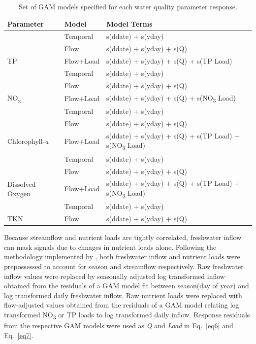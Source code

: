 \documentclass[fleqn,10pt,lineno]{wlpeerj} %
\begin{document}
\begin{table}

\caption{\label{tab:table3}Set of GAM models specified for each water quality parameter response.}
\centering
\begin{tabular}[t]{lll}
\toprule
Parameter & Model & Model Terms\\
\midrule
 & Temporal & s(ddate) + s(yday)\\

 & Flow & s(ddate) + s(yday) + s(Q)\\

\multirow{-3}{*}{\raggedright\arraybackslash TP} & Flow+Load & s(ddate) + s(yday) + s(Q) + s(TP Load)\\
\cmidrule{1-3}
 & Temporal & s(ddate) + s(yday)\\

 & Flow & s(ddate) + s(yday) + s(Q)\\

\multirow{-3}{*}{\raggedright\arraybackslash NO\textsubscript{x}} & Flow+Load & s(ddate) + s(yday) + s(Q) + s(NO\textsubscript{3} Load)\\
\cmidrule{1-3}
 & Temporal & s(ddate) + s(yday)\\

 & Flow & s(ddate) + s(yday) + s(Q)\\

\multirow{-3}{*}{\raggedright\arraybackslash Chlorophyll-\textit{a}} & Flow+Load & s(ddate) + s(yday) + s(Q) + s(TP Load) + s(NO\textsubscript{3} Load)\\
\cmidrule{1-3}
 & Temporal & s(ddate) + s(yday)\\

 & Flow & s(ddate) + s(yday) + s(Q)\\

\multirow{-3}{*}{\raggedright\arraybackslash Dissolved Oxygen} & Flow+Load & s(ddate) + s(yday) + s(Q) + s(TP Load) + s(NO\textsubscript{3}  Load)\\
\cmidrule{1-3}
 & Temporal & s(ddate) + s(yday)\\

\multirow{-2}{*}{\raggedright\arraybackslash TKN} & Flow & s(ddate) + s(yday) + s(Q)\\
\bottomrule
\end{tabular}
\end{table}

Because streamflow and nutrient loads are tightly correlated, freshwater
inflow can mask signals due to chnages in nutrient loads alone.
Following the methodology implemented by
\textcite{murphyNutrientImprovementsChesapeake2022}, both freshwater
inflow and nutrient loads were prepossessed to account for season and
streamflow respectively. Raw freshwater inflow values were replaced by
seasonally adjusted log transformed inflow obtained from the residuals
of a GAM model fit between season(day of year) and log transformed daily
freshwater inflow. Raw nutrient loads were replaced with flow-adjusted
values obtained from the residuals of a GAM model relating log
transformed NO\textsubscript{3} or TP loads to log transformed daily
inflow. Response residuals from the respective GAM models were used as
\emph{Q} and \emph{Load} in Eq.~\ref{eq6} and Eq.~\ref{eq7}.
\end{document}
